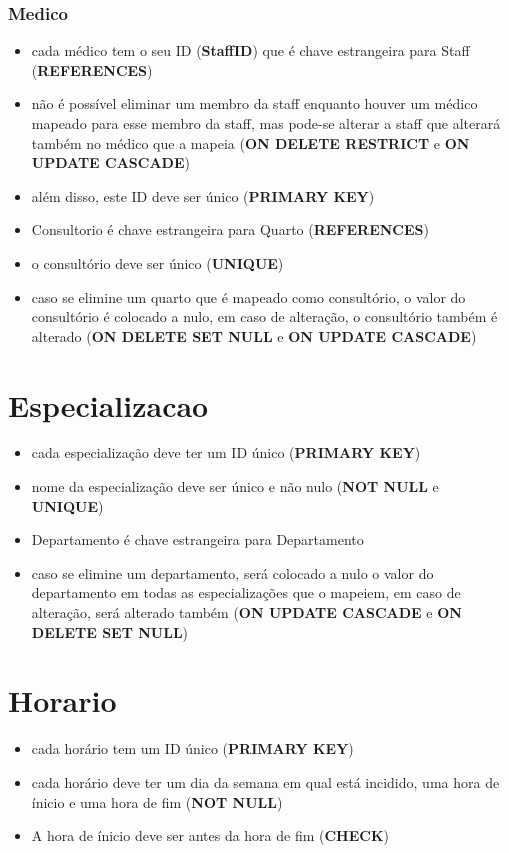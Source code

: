 \documentclass[article, a4paper, 12pt, oneside]{memoir}
\begin{document}
\subsubsection*{Medico}
\begin{itemize}
	\item cada médico tem o seu ID (\textbf{StaffID}) que é chave estrangeira para Staff (\textbf{REFERENCES})
	\item não é possível eliminar um membro da staff enquanto houver um médico mapeado para esse membro da staff, mas pode-se alterar a staff que alterará também no médico que a mapeia (\textbf{ON DELETE RESTRICT} e \textbf{ON UPDATE CASCADE})
	\item além disso, este ID deve ser único (\textbf{PRIMARY KEY})
	\item Consultorio é chave estrangeira para Quarto (\textbf{REFERENCES})
	\item o consultório deve ser único (\textbf{UNIQUE})
	\item caso se elimine um quarto que é mapeado como consultório, o valor do consultório é colocado a nulo, em caso de alteração, o consultório também é alterado (\textbf{ON DELETE SET NULL} e \textbf{ON UPDATE CASCADE})
\end{itemize}

\section*{Especializacao}
\begin{itemize}
	\item cada especialização deve ter um ID único (\textbf{PRIMARY KEY})
	\item nome da especialização deve ser único e não nulo (\textbf{NOT NULL} e \textbf{UNIQUE})
	\item Departamento é chave estrangeira para Departamento
	\item caso se elimine um departamento, será colocado a nulo o valor do departamento em todas as especializações que o mapeiem, em caso de alteração, será alterado também (\textbf{ON UPDATE CASCADE} e \textbf{ON DELETE SET NULL})
\end{itemize}

\section*{Horario}
\begin{itemize}
	\item cada horário tem um ID único (\textbf{PRIMARY KEY})
	\item cada horário deve ter um dia da semana em qual está incidido, uma hora de ínicio e uma hora de fim (\textbf{NOT NULL})
	\item A hora de ínicio deve ser antes da hora de fim (\textbf{CHECK})
\end{itemize}
\end{document}
